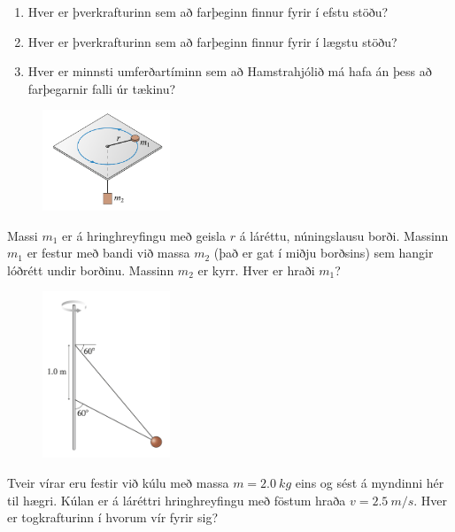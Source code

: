 \begin{enumerate}[label = \textbf{Dæmi \thechapter.\arabic*.}]
\begin{minipage}{\linewidth}
\begin{enumerate}[label = \textbf{(\alph*)}]
    \item Hver er þverkrafturinn sem að farþeginn finnur fyrir í efstu stöðu?
    
    \item Hver er þverkrafturinn sem að farþeginn finnur fyrir í lægstu stöðu?
    
    \item Hver er minnsti umferðartíminn sem að Hamstrahjólið má hafa án þess að farþegarnir falli úr tækinu?
\end{enumerate}

\begin{figure}
\vspace{-1.5cm}
\includegraphics[width=1.5in]{images/hringhreyfing3.png}
\end{figure}

\item Massi $m_1$ er á hringhreyfingu með geisla $r$ á láréttu, núningslausu borði. Massinn $m_1$ er festur með bandi við massa $m_2$ (það er gat í miðju borðsins) sem hangir lóðrétt undir borðinu. Massinn $m_2$ er kyrr. Hver er hraði $m_1$?
\end{minipage}

\begin{minipage}{\linewidth}
\begin{figure}
\vspace{-0.5cm}
\includegraphics[width=1.5in]{images/hringhreyfing4.png}
\end{figure}

\item Tveir vírar eru festir við kúlu með massa $m = \SI{2.0}{kg}$ eins og sést á myndinni hér til hægri. Kúlan er á láréttri hringhreyfingu með föstum hraða $v = \SI{2.5}{m/s}$. Hver er togkrafturinn í hvorum vír fyrir sig?


\end{minipage}
\end{enumerate}
